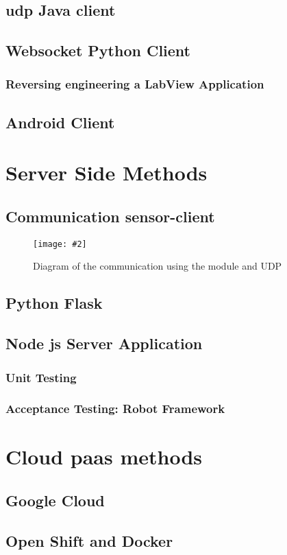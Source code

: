 \documentclass[hidelinks,11pt,a4paper,oneside,article]{memoir}
\newcommand{\putimage}[3][10] %
{
\begin{figure}[h]
	\centering
	\captionsetup{justification=centering}
	\texttt{[image: \#2]}
	\caption{#3}
	\label{fig:#2}
\end{figure}
}
\begin{document}
\subsection{\gls{udp} Java client}
\subsection{Websocket Python Client}
\subsubsection{Reversing engineering a LabView Application}
\subsection{Android Client}

\section{Server Side Methods}
\subsection{Communication sensor-client}
	\putimage{communication_udp}{Diagram of the communication using the module and UDP}
\subsection{Python Flask}
\subsection{Node js Server Application}
\subsubsection{Unit Testing}
\subsubsection{Acceptance Testing: Robot Framework}

\section{Cloud \gls{paas} methods}
\subsection{Google Cloud}
\subsection{Open Shift and Docker}
\end{document}
